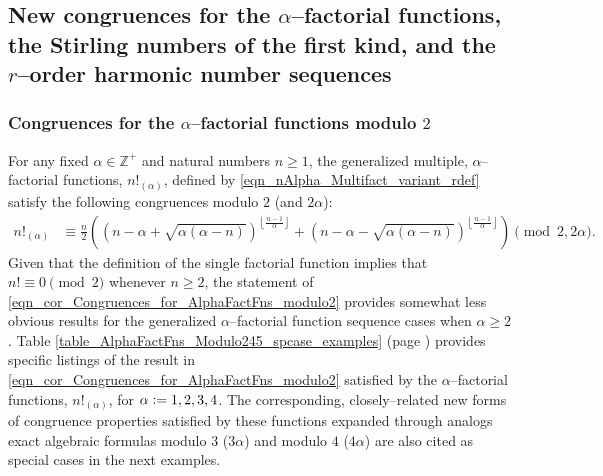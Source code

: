 \documentclass[12pt,reqno]{article}
\numberwithin{sfootnote}{section}
\newcommand{\tableref}[1]{Table \ref{#1} (page \pageref{#1})}
\numberwithin{equation}{section}
\theoremstyle{DefaultTheoremStyle}
\theoremstyle{definition}
\newcommand{\defequals}{\ensuremath{\vcentcolon=}}
\newcommand{\MultiFactorial}[2]{\ensuremath{#1!_{\left(#2\right)}}}
\begin{document}
\subsection{New congruences for the 
            $\alpha$--factorial functions, the 
            Stirling numbers of the first kind, and the 
            $r$--order harmonic number sequences} 
\label{subsubSection_Examples_NewCongruences} 

\subsubsection{Congruences for the $\alpha$--factorial functions modulo $2$} 
For any fixed $\alpha \in \mathbb{Z}^{+}$ and natural numbers $n \geq 1$, the 
generalized multiple, $\alpha$--factorial functions, $n!_{(\alpha)}$, 
defined by \eqref{eqn_nAlpha_Multifact_variant_rdef} 
satisfy the following congruences 
modulo $2$ (and $2\alpha$): 
\begin{align} 
\label{eqn_cor_Congruences_for_AlphaFactFns_modulo2} 
n!_{(\alpha)} & \equiv 
     \frac{n}{2} \left(\left(n-\alpha + \sqrt{\alpha 
     (\alpha -n)}\right)^{\left\lfloor \frac{n-1}{\alpha }\right\rfloor } + 
     \left(n-\alpha - \sqrt{\alpha (\alpha -n)}\right)^{\left\lfloor 
     \frac{n-1}{\alpha }\right\rfloor }\right) \pmod{2, 2\alpha}. 
\end{align} 
Given that the definition of the single factorial function implies that 
$n! \equiv 0 \pmod{2}$ whenever $n \geq 2$, the statement of 
\eqref{eqn_cor_Congruences_for_AlphaFactFns_modulo2} 
provides somewhat less obvious results for the 
generalized $\alpha$--factorial function sequence cases when $\alpha \geq 2$. 
\tableref{table_AlphaFactFns_Modulo245_spcase_examples} 
provides specific listings of the result in 
\eqref{eqn_cor_Congruences_for_AlphaFactFns_modulo2} satisfied by the 
$\alpha$--factorial functions, $\MultiFactorial{n}{\alpha}$, 
for $\alpha \defequals 1, 2, 3, 4$. 
The corresponding, closely--related new forms of 
congruence properties satisfied by 
these functions expanded through analogs exact algebraic formulas 
modulo $3$ ($3\alpha$) and modulo $4$ ($4\alpha$) are also cited 
as special cases in the next examples. 
\end{document}
